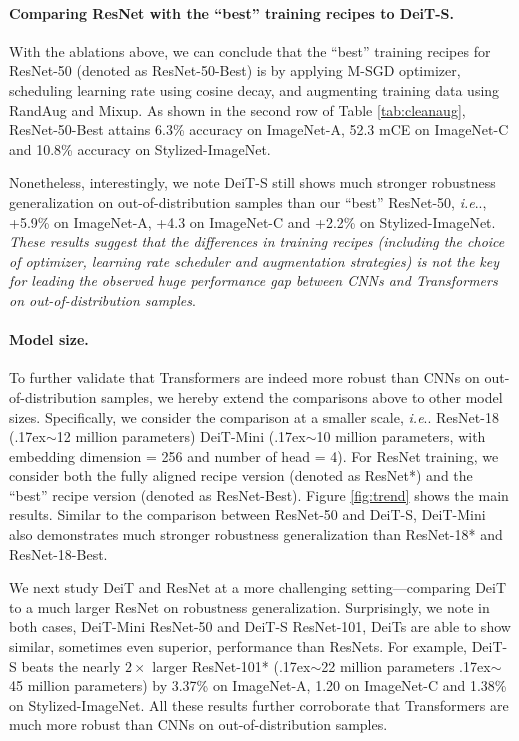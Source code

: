 \documentclass{article}
\makeatletter
\def\vs{{\bm{s}}}
\newcommand{\app}{\raise.17ex\hbox{$\scriptstyle\sim$}}
\DeclareRobustCommand\onedot{\futurelet\@let@token\@onedot}
\def\@onedot{\ifx\@let@token.\else.\null\fi\xspace}
\def\ie{\emph{i.e}\onedot} \def\Ie{\emph{I.e}\onedot}
\makeatother
\begin{document}
\paragraph{Comparing ResNet with the ``best'' training recipes to DeiT-S.}
With the ablations above, we can conclude that the ``best'' training recipes for ResNet-50 (denoted as ResNet-50-Best) is by applying M-SGD optimizer, scheduling learning rate using cosine decay, and augmenting training data using RandAug and Mixup. As shown in the second row of Table \ref{tab:cleanaug}, ResNet-50-Best attains 6.3\% accuracy on ImageNet-A, 52.3 mCE on ImageNet-C and 10.8\% accuracy on Stylized-ImageNet.

Nonetheless, interestingly, we note DeiT-S still shows much stronger robustness generalization on out-of-distribution samples than our ``best'' ResNet-50, \ie,  +5.9\% on ImageNet-A, +4.3 on ImageNet-C and +2.2\% on Stylized-ImageNet. \emph{These results suggest that the differences in training recipes (including the choice of optimizer, learning rate scheduler and augmentation strategies) is not the key for leading the observed huge performance gap between CNNs and Transformers on out-of-distribution samples}. 

\paragraph{Model size.}  
To further validate that Transformers are indeed more robust than CNNs on out-of-distribution samples, we hereby extend the comparisons above to other model sizes. Specifically, we consider the comparison at a smaller scale, \ie ResNet-18 (\app12 million parameters) \vs DeiT-Mini (\app 10 million parameters, with embedding dimension = 256 and number of head = 4). For ResNet training, we consider both the fully aligned recipe version (denoted as ResNet*) and the ``best'' recipe version (denoted as ResNet-Best). Figure \ref{fig:trend}  shows the main results. Similar to the comparison between ResNet-50 and DeiT-S, DeiT-Mini also demonstrates much stronger robustness generalization than ResNet-18* and ResNet-18-Best. 

We next study DeiT and ResNet at a more challenging setting---comparing DeiT to a much larger ResNet on robustness generalization. Surprisingly, we note in both cases, DeiT-Mini \vs ResNet-50 and DeiT-S \vs ResNet-101, DeiTs are able to show similar, sometimes even superior, performance than ResNets. For example, DeiT-S beats the nearly $2\times$ larger ResNet-101* (\app22 million parameters \vs \app45 million parameters) by 3.37\% on ImageNet-A, 1.20 on ImageNet-C and 1.38\% on Stylized-ImageNet. All these results further corroborate that Transformers are much more robust than CNNs on out-of-distribution samples. 
\end{document}
